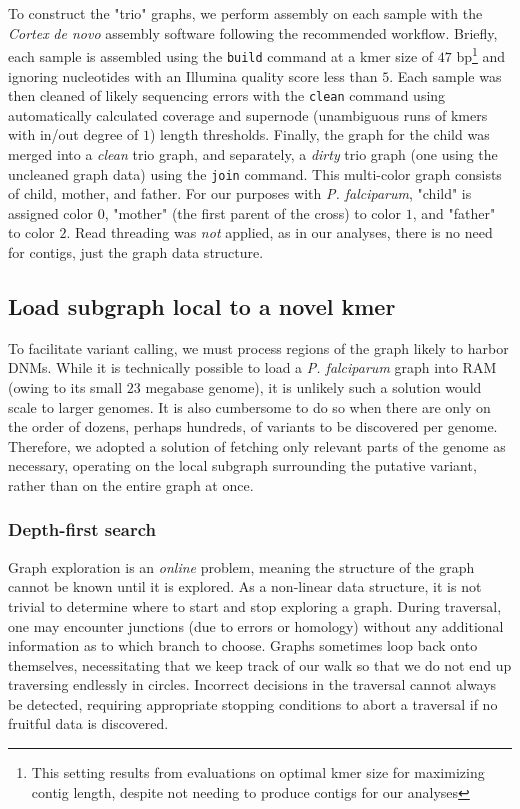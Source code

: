 To construct the "trio" graphs, we perform assembly on each sample with the \textit{Cortex} \textit{de novo} assembly software\cite{Iqbal:2012fx} following the recommended workflow\cite{Turner:2015ve}.  Briefly, each sample is assembled using the \texttt{build} command at a kmer size of $47$ bp\footnote{This setting results from evaluations on optimal kmer size for maximizing contig length, despite not needing to produce contigs for our analyses} and ignoring nucleotides with an Illumina quality score less than $5$.  Each sample was then cleaned of likely sequencing errors with the \texttt{clean} command using automatically calculated coverage and supernode (unambiguous runs of kmers with in/out degree of $1$) length thresholds.  Finally, the graph for the child was merged into a \textit{clean} trio graph, and separately, a \textit{dirty} trio graph (one using the uncleaned graph data) using the \texttt{join} command.  This multi-color graph consists of child, mother, and father.  For our purposes with \textit{P. falciparum}, "child" is assigned color $0$, "mother" (the first parent of the cross) to color $1$, and "father" to color $2$.  Read threading was \textit{not} applied, as in our analyses, there is no need for contigs, just the graph data structure.

\subsection{Load subgraph local to a novel kmer}

To facilitate variant calling, we must process regions of the graph likely to harbor DNMs.  While it is technically possible to load a \textit{P. falciparum} graph into RAM (owing to its small $23$ megabase genome), it is unlikely such a solution would scale to larger genomes.  It is also cumbersome to do so when there are only on the order of dozens, perhaps hundreds, of variants to be discovered per genome.  Therefore, we adopted a solution of fetching only relevant parts of the genome as necessary, operating on the local subgraph surrounding the putative variant, rather than on the entire graph at once.

\subsubsection{Depth-first search}

Graph exploration is an \textit{online} problem, meaning the structure of the graph cannot be known until it is explored.  As a non-linear data structure, it is not trivial to determine where to start and stop exploring a graph.  During traversal, one may encounter junctions (due to errors or homology) without any additional information as to which branch to choose.  Graphs sometimes loop back onto themselves, necessitating that we keep track of our walk so that we do not end up traversing endlessly in circles.  Incorrect decisions in the traversal cannot always be detected, requiring appropriate stopping conditions to abort a traversal if no fruitful data is discovered.

